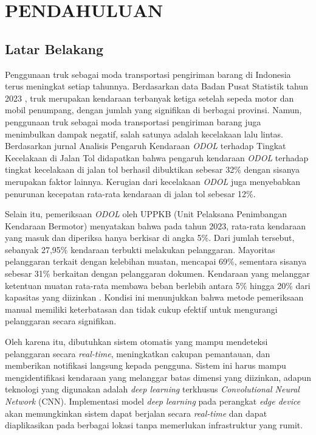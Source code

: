 \chapter{PENDAHULUAN}
\label{chap:pendahuluan}


\section{Latar Belakang}
\label{sec:latarbelakang}
Penggunaan truk sebagai moda transportasi pengiriman barang di Indonesia terus meningkat setiap tahunnya. Berdasarkan data Badan Pusat Statistik tahun 2023 \parencite*{bps2023}, truk merupakan kendaraan terbanyak ketiga setelah sepeda motor dan mobil penumpang, dengan jumlah yang signifikan di berbagai provinsi. Namun, penggunaan truk sebagai moda transportasi pengiriman barang juga menimbulkan dampak negatif, salah satunya adalah kecelakaan lalu lintas. Berdasarkan jurnal Analisis Pengaruh Kendaraan \emph{ODOL} terhadap Tingkat Kecelakaan di Jalan Tol \parencite*{odol2020} didapatkan bahwa pengaruh kendaraan \emph{ODOL} terhadap tingkat kecelakaan di jalan tol berhasil dibuktikan sebesar 32\% dengan sisanya merupakan faktor lainnya. Kerugian dari kecelakaan \emph{ODOL} juga menyebabkan penurunan kecepatan rata-rata kendaraan di jalan tol sebesar 12\%.

Selain itu, pemeriksaan \emph{ODOL} oleh UPPKB (Unit Pelaksana Penimbangan Kendaraan Bermotor) menyatakan bahwa pada tahun 2023, rata-rata kendaraan yang masuk dan diperiksa hanya berkisar di angka 5\%. Dari jumlah tersebut, sebanyak 27,95\% kendaraan terbukti melakukan pelanggaran. Mayoritas pelanggaran terkait dengan kelebihan muatan, mencapai 69\%, sementara sisanya sebesar 31\% berkaitan dengan pelanggaran dokumen. Kendaraan yang melanggar ketentuan muatan rata-rata membawa beban berlebih antara 5\% hingga 20\% dari kapasitas yang diizinkan \parencite*{hubdat2024}. Kondisi ini menunjukkan bahwa metode pemeriksaan manual memiliki keterbatasan dan tidak cukup efektif untuk mengurangi pelanggaran secara signifikan.

Oleh karena itu, dibutuhkan sistem otomatis yang mampu mendeteksi pelanggaran secara \emph{real-time}, meningkatkan cakupan pemantauan, dan memberikan notifikasi langsung kepada pengguna. Sistem ini harus mampu mengidentifikasi kendaraan yang melanggar batas dimensi yang diizinkan, adapun teknologi yang digunakan adalah \emph{deep learning} terkhusus \emph{Convolutional Neural Network} (CNN). Implementasi model \emph{deep learning} pada perangkat \emph{edge device} akan memungkinkan sistem dapat berjalan secara \emph{real-time} dan dapat diaplikasikan pada berbagai lokasi tanpa memerlukan infrastruktur yang rumit.

